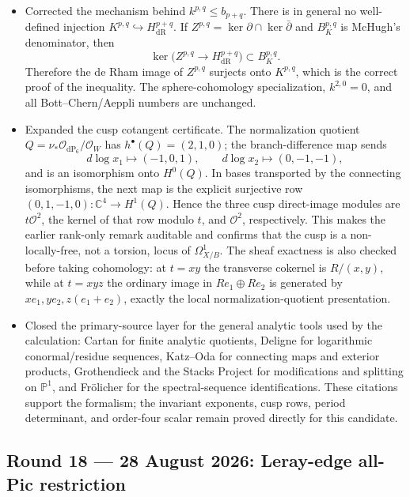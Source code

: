 \begin{itemize}[leftmargin=1.8em]
\item Corrected the mechanism behind $k^{p,q}\le b_{p+q}$.  There is in
general no well-defined injection $K^{p,q}\hookrightarrow
H^{p+q}_{\mathrm{dR}}$.  If $Z^{p,q}=\ker\partial\cap\ker\bar\partial$ and
$B_K^{p,q}$ is McHugh's denominator, then
\[
 \ker\bigl(Z^{p,q}\to H^{p+q}_{\mathrm{dR}}\bigr)\subset B_K^{p,q}.
\]
Therefore the de Rham image of $Z^{p,q}$ surjects onto $K^{p,q}$, which is
the correct proof of the inequality.  The sphere-cohomology specialization,
$k^{2,0}=0$, and all Bott--Chern/Aeppli numbers are unchanged.
\item Expanded the cusp cotangent certificate.  The normalization quotient
$Q=\nu_*\mathcal O_{\mathrm{dP}_6}/\mathcal O_W$ has
$h^\bullet(Q)=(2,1,0)$; the branch-difference map sends
\[
 d\log x_1\mapsto(-1,0,1),\qquad
 d\log x_2\mapsto(0,-1,-1),
\]
and is an isomorphism onto $H^0(Q)$.  In bases transported by the connecting
isomorphisms, the next map is the explicit surjective row
$(0,1,-1,0):\mathbb C^4\to H^1(Q)$.  Hence the three cusp direct-image
modules are $t\mathcal O^2$, the kernel of that row modulo $t$, and
$\mathcal O^2$, respectively.  This makes the earlier rank-only remark
auditable and confirms that the cusp is a non-locally-free, not a torsion,
locus of $\Omega^1_{X/B}$.
The sheaf exactness is also checked before taking cohomology: at $t=xy$ the
transverse cokernel is $R/(x,y)$, while at $t=xyz$ the ordinary image in
$Re_1\oplus Re_2$ is generated by $xe_1,ye_2,z(e_1+e_2)$, exactly the local
normalization-quotient presentation.
\item Closed the primary-source layer for the general analytic tools used by
the calculation: Cartan for finite analytic quotients, Deligne for logarithmic
conormal/residue sequences, Katz--Oda for connecting maps and exterior
products, Grothendieck and the Stacks Project for modifications and splitting
on $\mathbb P^1$, and Fr\"olicher for the spectral-sequence identifications.
These citations support the formalism; the invariant exponents, cusp rows,
period determinant, and order-four scalar remain proved directly for this
candidate.
\end{itemize}

\subsection*{Round 18 --- 28 August 2026: Leray-edge all-Pic restriction}

